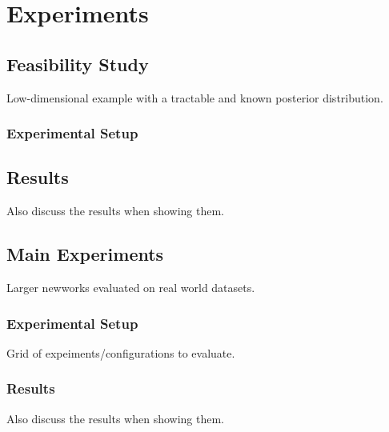 \section{Experiments}\label{sec:experiments}

\subsection{Feasibility Study}
Low-dimensional example with a tractable and known posterior distribution.
\subsubsection{Experimental Setup}
\subsection{Results}
Also discuss the results when showing them.


\subsection{Main Experiments}
Larger newworks evaluated on real world datasets.
\subsubsection{Experimental Setup}
Grid of expeiments/configurations to evaluate.
\subsubsection{Results}
Also discuss the results when showing them.


\newpage
